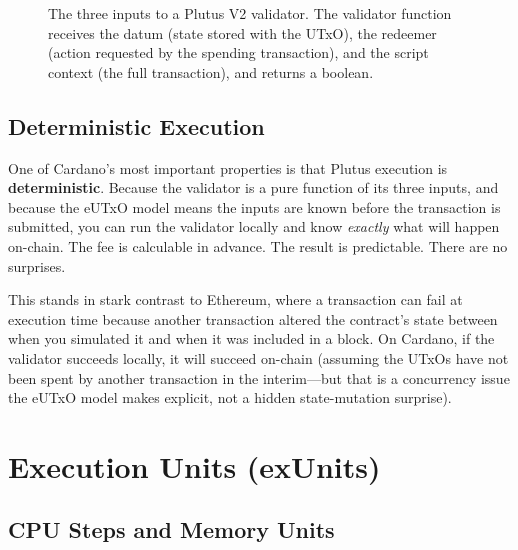 \begin{figure}[H]
\caption{The three inputs to a Plutus V2 validator. The validator function receives the datum (state stored with the UTxO), the redeemer (action requested by the spending transaction), and the script context (the full transaction), and returns a boolean.}
\label{fig:plutus-validator}
\end{figure}

\subsection{Deterministic Execution}

One of Cardano's most important properties is that Plutus execution is
\textbf{deterministic}. Because the validator is a pure function of its
three inputs, and because the eUTxO model means the inputs are known
before the transaction is submitted, you can run the validator locally
and know \emph{exactly} what will happen on-chain. The fee is
calculable in advance. The result is predictable. There are no
surprises.

This stands in stark contrast to Ethereum, where a transaction can fail
at execution time because another transaction altered the contract's
state between when you simulated it and when it was included in a
block. On Cardano, if the validator succeeds locally, it will succeed
on-chain (assuming the UTxOs have not been spent by another transaction
in the interim---but that is a concurrency issue the eUTxO model makes
explicit, not a hidden state-mutation surprise).


\section{Execution Units (exUnits)}
\label{sec:exunits}

\subsection{CPU Steps and Memory Units}

